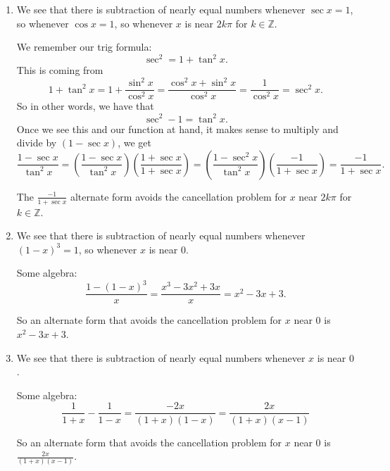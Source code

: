 \documentclass[pdftex,11pt]{article}
\begin{document}
\begin{enumerate}

\item

We see that there is subtraction of nearly equal numbers whenever $\sec x = 1$,
so whenever $\cos x =1$, so whenever $x$ is near $2k\pi$ for $k\in\mathbb{Z}$.

We remember our trig formula: 
$$\sec^2 = 1+\tan^2x.$$
This is coming from 
$$1+\tan^2x = 1+\frac{\sin^2x}{\cos^2x}=\frac{\cos^2x+\sin^2x}{\cos^2x}=\frac{1}{\cos^2x}=\sec^2x.$$
So in other words, we have that
$$\sec^2-1 = \tan^2x.$$
Once we see this and our function at hand, it makes sense to multiply and divide by $(1-\sec x)$, we get
$$\frac{1-\sec x}{\tan^2x}
=
\left(\frac{1-\sec x}{\tan^2x}\right)
\left(\frac{1+\sec x}{1+\sec x}\right)
=
\left(\frac{1-\sec^2 x}{\tan^2x}\right)
\left(\frac{-1}{1+\sec x}\right)
=
\frac{-1}{1+\sec x}.$$

The $\frac{-1}{1+\sec x}$ alternate form avoids the cancellation problem for $x$ near $2k\pi$ for $k\in\mathbb{Z}$.

\item

We see that there is subtraction of nearly equal numbers whenever $(1-x)^3 = 1$, so whenever $x$ is near $0$.

Some algebra:
$$\frac{1-(1-x)^3}{x} 
= 
\frac{x^3-3x^2+3x}{x} 
=x^2-3x+3.
$$

So an alternate form that avoids the cancellation problem for $x$ near $0$ is $x^2-3x+3$.

\item

We see that there is subtraction of nearly equal numbers whenever $x$ is near $0$.

Some algebra:
$$
\frac{1}{1+x}-\frac{1}{1-x}
= 
\frac{-2x}{(1+x)(1-x)}
=
\frac{2x}{(1+x)(x-1)}
$$

So an alternate form that avoids the cancellation problem for $x$ near $0$ is 
$\frac{2x}{(1+x)(x-1)}$.

\end{enumerate}
\end{document}
